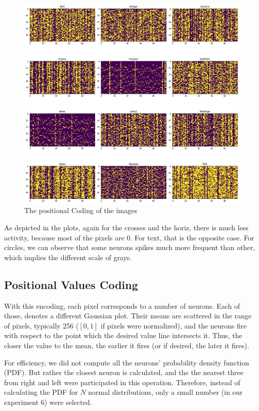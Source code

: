 \documentclass{article}
\begin{document}
	\begin{figure}[h]
		\includegraphics[width=1.2\textwidth]{images_poisson.png}
		\caption{The positional Coding of the images}
		\label{impois}
	\end{figure}
	
	As depicted in the plots, again for the crosses and the horiz, there is much less activity, because most of the pixels are 0. For text, that is the opposite case. For circles, we can observe that some neurons spikes much more frequent than other, which implies the different scale of grays.
	
	\subsection{Positional Values Coding}
	With this encoding, each pixel corresponds to a number of neurons. Each of those, denotes a different Gaussian plot. Their means are scattered in the range of pixels, typically 256 ($ [0, 1]$ if pixels were normalized), and the neurons fire with respect to the point which the desired value line intersects it. Thus, the closer the value to the mean, the earlier it fires (or if desired, the later it fires). 
	
	For efficiency, we did not compute all the neurons' probability density function (PDF). But rather the closest neuron is calculated, and the the nearest three from right and left were participated in this operation. Therefore, instead of calculating the PDF for $N$ normal distributions, only a small number (in our experiment 6) were selected.
	
\end{document}
